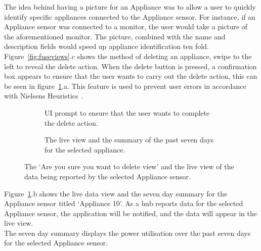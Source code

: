 \documentclass[preprint,12pt,3p]{elsarticle}
\begin{document}
The idea behind having a picture for an Appliance was to allow a user to quickly identify specific appliances connected to the Appliance sensor. For instance, if an Appliance sensor was connected to a monitor, the user would take a picture of the aforementioned monitor. The picture, combined with the name and description fields would speed up appliance identification ten fold.\\
Figure~\ref{fig:fuseviews}.c shows the method of deleting an appliance, swipe to the left to reveal the delete action. When the delete button is pressed, a confirmation box appears to ensure that the user wants to carry out the delete action, this can be seen in figure~\ref{fig:deletelive}.a. This feature is used to prevent user errors in accordance with Nielsens Heuristics~\cite{nielsen}.

\begin{figure}[H]
    \centering
    \begin{subfigure}[t]{0.32\columnwidth}
        \centering
        \caption{UI prompt to ensure that the user wants to complete the delete action.}
    \end{subfigure}
    \begin{subfigure}[t]{0.32\columnwidth}
        \centering
        \caption{The live view and the summary of the past seven days for the selected appliance.}
    \end{subfigure}
    \caption{The `Are you sure you want to delete view' and the live view of the data being reported by the selected Appliance sensor.}
    \label{fig:deletelive}
\end{figure}
Figure~\ref{fig:deletelive}.b shows the live data view and the seven day summary for the Appliance sensor titled `Appliance 10'. As a hub reports data for the selected Appliance sensor, the application will be notified, and the data will appear in the live view.\\
The seven day summary displays the power utilisation over the past seven days for the selected Appliance sensor.
\end{document}
